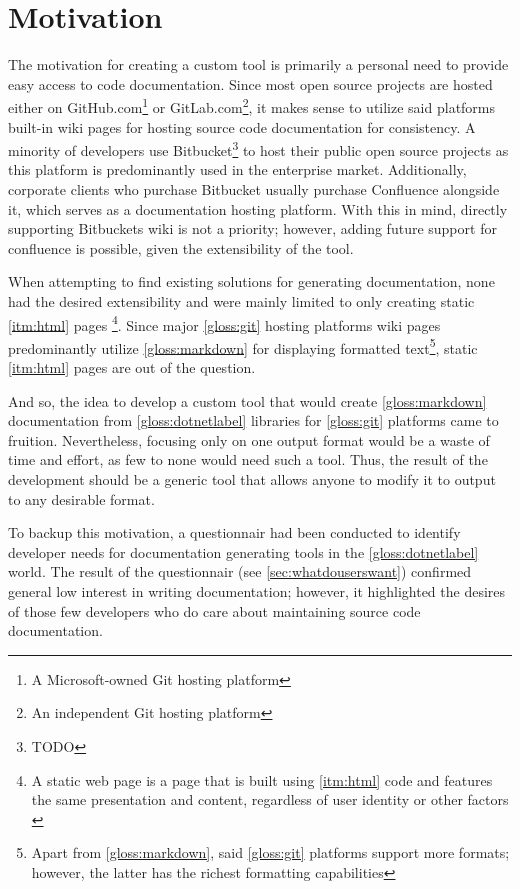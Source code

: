 \section*{Motivation}

The motivation for creating a custom tool is primarily a personal need to provide easy access to code documentation. Since most open source projects are hosted either on GitHub.com\footnote{A Microsoft-owned Git hosting platform} or GitLab.com\footnote{An independent Git hosting platform}, it makes sense to utilize said platforms built-in wiki pages for hosting source code documentation for consistency. A minority of developers use Bitbucket\footnote{TODO} to host their public open source projects as this platform is predominantly used in the enterprise market. Additionally, corporate clients who purchase Bitbucket usually purchase Confluence alongside it, which serves as a documentation hosting platform. With this in mind, directly supporting Bitbuckets wiki is not a priority; however, adding future support for confluence is possible, given the extensibility of the tool.

When attempting to find existing solutions for generating documentation, none had the desired extensibility and were mainly limited to only creating static \ref{itm:html} pages
\footnote{A static web page is a page that is built using \ref{itm:html} code and features the same presentation and content, regardless of user identity or other factors \cite{techopedia_what_2017}}.
Since major \ref{gloss:git} hosting platforms wiki pages predominantly utilize \ref{gloss:markdown} for displaying formatted text\footnote{Apart from \ref{gloss:markdown}, said \ref{gloss:git} platforms support more formats; however, the latter has the richest formatting capabilities}, static \ref{itm:html} pages are out of the question.

And so, the idea to develop a custom tool that would create \ref{gloss:markdown} documentation from \ref{gloss:dotnetlabel} libraries for \ref{gloss:git} platforms came to fruition. Nevertheless, focusing only on one output format would be a waste of time and effort, as few to none would need such a tool. Thus, the result of the development should be a generic tool that allows anyone to modify it to output to any desirable format.

To backup this motivation, a questionnair had been conducted to identify developer needs for documentation generating tools in the \ref{gloss:dotnetlabel} world. The result of the questionnair (see \ref{sec:whatdouserswant}) confirmed general low interest in writing documentation; however, it highlighted the desires of those few developers who do care about maintaining source code documentation.


